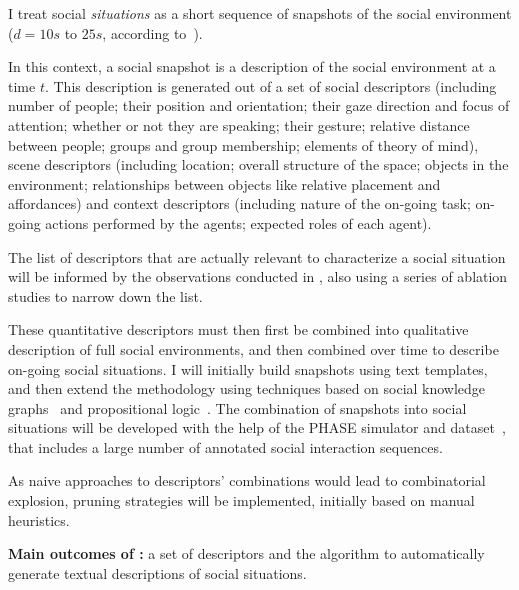 I treat social \emph{situations} as a short sequence of snapshots of the social
environment ($d=10s$ to $25s$, according to~\cite{netanyahu2021phase}).

In this context, a social snapshot is a description of the social environment
at a time $t$. This description is generated out of a set of social descriptors
(including number of people; their position and orientation; their gaze
direction and focus of attention; whether or not they are speaking; their
gesture; relative distance between people; groups and group membership;
elements of theory of mind), scene descriptors (including location; overall
structure of the space; objects in the environment; relationships between
objects like relative placement and affordances) and context descriptors
(including nature of the on-going task; on-going actions performed by the
agents; expected roles of each agent).

The list of descriptors that are actually relevant to characterize a social
situation will be informed by the observations conducted in \tDA, also using a series of ablation studies to narrow down the list.

These quantitative descriptors must then first be combined into qualitative
description of full social environments, and then combined over time to
describe on-going social situations. I will initially build snapshots using
text templates, and then extend the methodology using techniques based on
social knowledge graphs~\cite{sap2019atomic} and propositional
logic~\cite{tsoi2022sean}. The combination of snapshots into social situations
will be developed with the help of the PHASE simulator and
dataset~\cite{netanyahu2021phase}, that includes a large number of annotated
social interaction sequences.

As naive approaches to descriptors' combinations would lead to combinatorial
explosion, pruning strategies will be implemented, initially based on manual
heuristics.




\begin{framed}
    {\noindent\bf Main outcomes of \tAA:} a set of descriptors and the algorithm to automatically generate textual descriptions of social situations.
\end{framed}

\paragraph{\TAB}

